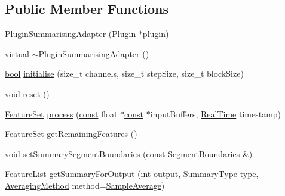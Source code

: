 \subsection*{Public Member Functions}
\begin{DoxyCompactItemize}
\item 
\hyperlink{class_vamp_1_1_host_ext_1_1_plugin_summarising_adapter_a31b41f54560a2ae6c3ec1a945f3f1d68}{Plugin\+Summarising\+Adapter} (\hyperlink{class_vamp_1_1_plugin}{Plugin} $\ast$plugin)
\item 
virtual \hyperlink{class_vamp_1_1_host_ext_1_1_plugin_summarising_adapter_a1259acddfab21df8e3137a4cd95801bd}{$\sim$\+Plugin\+Summarising\+Adapter} ()
\item 
\hyperlink{mac_2config_2i386_2lib-src_2libsoxr_2soxr-config_8h_abb452686968e48b67397da5f97445f5b}{bool} \hyperlink{class_vamp_1_1_host_ext_1_1_plugin_summarising_adapter_a1e994576d43efe103bf8f83b69716745}{initialise} (size\+\_\+t channels, size\+\_\+t step\+Size, size\+\_\+t block\+Size)
\item 
\hyperlink{sound_8c_ae35f5844602719cf66324f4de2a658b3}{void} \hyperlink{class_vamp_1_1_host_ext_1_1_plugin_summarising_adapter_a3402381d145d507bd26d1a67e3616911}{reset} ()
\item 
\hyperlink{class_vamp_1_1_plugin_a448fb57dc245d47923ec9eeaf9856c5f}{Feature\+Set} \hyperlink{class_vamp_1_1_host_ext_1_1_plugin_summarising_adapter_ab375afa4d24bafd57b838fee1767359f}{process} (\hyperlink{getopt1_8c_a2c212835823e3c54a8ab6d95c652660e}{const} float $\ast$\hyperlink{getopt1_8c_a2c212835823e3c54a8ab6d95c652660e}{const} $\ast$input\+Buffers, \hyperlink{struct_vamp_1_1_real_time}{Real\+Time} timestamp)
\item 
\hyperlink{class_vamp_1_1_plugin_a448fb57dc245d47923ec9eeaf9856c5f}{Feature\+Set} \hyperlink{class_vamp_1_1_host_ext_1_1_plugin_summarising_adapter_ae5005272410cdf58054e1d5e86f281cc}{get\+Remaining\+Features} ()
\item 
\hyperlink{sound_8c_ae35f5844602719cf66324f4de2a658b3}{void} \hyperlink{class_vamp_1_1_host_ext_1_1_plugin_summarising_adapter_a1a659500ca1290a228c0b9b91f6ac0b7}{set\+Summary\+Segment\+Boundaries} (\hyperlink{getopt1_8c_a2c212835823e3c54a8ab6d95c652660e}{const} \hyperlink{class_vamp_1_1_host_ext_1_1_plugin_summarising_adapter_a74e7f93c745802a2409185b63922466b}{Segment\+Boundaries} \&)
\item 
\hyperlink{class_vamp_1_1_plugin_a0730bc72c87fa02eb8d2854b233f7be1}{Feature\+List} \hyperlink{class_vamp_1_1_host_ext_1_1_plugin_summarising_adapter_abdc8e64c800f78e02d67238a7abb95bc}{get\+Summary\+For\+Output} (\hyperlink{xmltok_8h_a5a0d4a5641ce434f1d23533f2b2e6653}{int} \hyperlink{mm_8c_aeb3fcf4ab0f02cc4420e5a97568a07ef}{output}, \hyperlink{class_vamp_1_1_host_ext_1_1_plugin_summarising_adapter_af504f810448961fc489e9b6572471705}{Summary\+Type} type, \hyperlink{class_vamp_1_1_host_ext_1_1_plugin_summarising_adapter_a294e9eed9c541dcedbaa4f2dfda1ac76}{Averaging\+Method} method=\hyperlink{class_vamp_1_1_host_ext_1_1_plugin_summarising_adapter_a294e9eed9c541dcedbaa4f2dfda1ac76ae8833d866dec593d29f1f4e3cd1e6e36}{Sample\+Average})

\end{DoxyCompactItemize}
